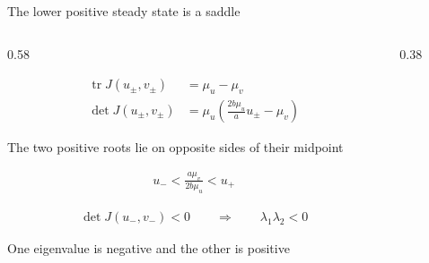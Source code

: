 \begin{frame}{The lower positive steady state is a saddle}

  \vspace{-0.18cm}

  \begin{columns}[c,onlytextwidth]

    \begin{column}{0.58\textwidth}

      {\color{HydraWhite}\fontsize{9.6}{12.2}\selectfont
      \begin{align*}
        \operatorname{tr}J(u_\pm,v_\pm)
        &=
        \mu_u-\mu_v
        \\
        \det J(u_\pm,v_\pm)
        &=
        \mu_u
        \left(
          \frac{2b\mu_u}{a}u_\pm-\mu_v
        \right)
      \end{align*}
      }

      \vspace{-0.36cm}

      {\color{HydraMuted}\fontsize{7.7}{9.5}\selectfont
        The two positive roots lie on opposite sides of their midpoint
      \par}

      \vspace{-0.26cm}

      {\color{HydraWhite}\fontsize{9.8}{12.5}\selectfont
      \begin{align*}
        u_-
        <
        \frac{a\mu_v}{2b\mu_u}
        <
        u_+
      \end{align*}
      }

      \vspace{-0.42cm}

      {\color{HydraRed}\bfseries\fontsize{10.8}{13.7}\selectfont
      \begin{align*}
        \boxed{
          \det J(u_-,v_-)<0
        }
        \qquad\Rightarrow\qquad
        \lambda_1\lambda_2<0
      \end{align*}
      }

      \vspace{-0.38cm}

        {One eigenvalue is negative and the other is positive}

    \end{column}

    \begin{column}{0.38\textwidth}
      \centering


\end{column}
\end{columns}
\end{frame}
